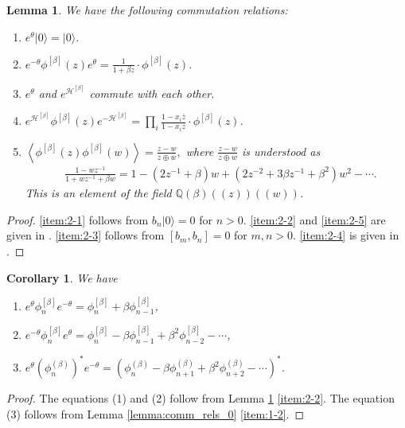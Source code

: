 \documentclass{amsart}
\newtheorem{lemma}[thm]{Lemma}
\newtheorem{cor}[thm]{Corollary}
\def\QQ{\mathord{\mathbb{Q}}}
\def\ket#1{\vert #1 \rangle}
\begin{document}
\begin{lemma}\label{lemma:commutation_rels}
We have the following commutation relations:
\begin{enumerate}
\item\label{item:2-1} $e^{\theta}\ket{0}=\ket{0}$.
\item \label{item:2-2}
$e^{-\theta}\phi^{[\beta]}(z)e^{\theta}=\frac{1}{1+\beta z}\cdot \phi^{[\beta]}(z)$.
\item\label{item:2-3} $e^\theta$ and $e^{\mathcal{H}^{[\beta]}}$ commute with each other.
\item \label{item:2-4}
$e^{\mathcal{H}^{[\beta]}}\phi^{[\beta]}(z)e^{-\mathcal{H}^{[\beta]}}
=
\prod_{i}\frac{1-x_i\overline{z}}{1-x_iz}\cdot
\phi^{[\beta]}(z)
$.
\item \label{item:2-5}
$
\left\langle
\phi^{[\beta]}(z)\phi^{[\beta]}(w)
\right\rangle
=\frac{z-w}{z\oplus w},
$
where $\frac{z-w}{z\oplus w}$ is understood as
\[
\begin{aligned}
&\textstyle
\frac{1-wz^{-1}}{1+wz^{-1}+\beta w}=
1-(2z^{-1}+\beta)w+(2z^{-2}+3\beta z^{-1}+\beta^2)w^2-\cdots.
\end{aligned}
\]
This is an element of the field $\QQ(\beta)((z))((w))$.
\end{enumerate}
\end{lemma}
\begin{proof}
\eqref{item:2-1} follows from $b_{n}\ket{0}=0$ for $n>0$.
\eqref{item:2-2} and \eqref{item:2-5} are given in \cite[\S 10.1]{iwao2021neutralfermionic}.
\eqref{item:2-3} follows from $[b_m,b_n]=0$ for $m,n>0$.
\eqref{item:2-4} is given in \cite[\S 9.1]{iwao2021neutralfermionic}.
\end{proof}

\begin{cor}\label{cor:sublemma}
We have
\begin{enumerate}
\item\label{item:aa} $e^{\theta}\phi_n^{[\beta]}e^{-\theta}=\phi^{[\beta]}_n+\beta \phi^{[\beta]}_{n-1}$,
\item
$e^{-\theta}\phi_n^{[\beta]}e^{\theta}=\phi^{[\beta]}_n-\beta \phi^{[\beta]}_{n-1}+\beta^2\phi^{[\beta]}_{n-2}-\cdots$,
\item\label{item:bb} 
$e^{\theta}(\phi_n^{(\beta)})^\ast e^{-\theta}=
(\phi_n^{(\beta)}
-\beta \phi_{n+1}^{(\beta)}
+\beta^2 \phi_{n+2}^{(\beta)}-\cdots)^\ast
$.
\end{enumerate}
\end{cor}
\begin{proof}
The equations (1) and (2) follow from Lemma \ref{lemma:commutation_rels} \eqref{item:2-2}.
The equation (3) follows from Lemma \ref{lemma:comm_rels_0} \eqref{item:1-2}.
\end{proof}
\end{document}
